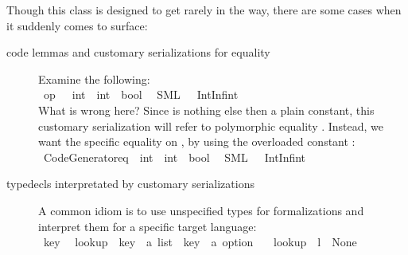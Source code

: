 \begin{isabellebody}
\begin{isamarkuptext}
  Though this class is designed to get rarely in the way, there
  are some cases when it suddenly comes to surface:%
\end{isamarkuptext}%
\isamarkuptrue%
%
\begin {description}
    \item[code lemmas and customary serializations for equality]
      Examine the following: \\
\isamarkupfalse%
\ {\isachardoublequoteopen}op\ {\isacharequal}\ {\isasymColon}\ int\ {\isasymRightarrow}\ int\ {\isasymRightarrow}\ bool{\isachardoublequoteclose}\isanewline
\ \ {\isacharparenleft}SML\ {\isachardoublequoteopen}{\isacharbang}{\isacharparenleft}{\isacharunderscore}\ {\isacharcolon}\ IntInf{\isachardot}int\ {\isacharequal}\ {\isacharunderscore}{\isacharparenright}{\isachardoublequoteclose}{\isacharparenright}%
\\ What is wrong here? Since  is nothing else then
  a plain constant, this customary serialization will refer
  to polymorphic equality .
  Instead, we want the specific equality on ,
  by using the overloaded constant : \\
\isamarkupfalse%
\ {\isachardoublequoteopen}Code{\isacharunderscore}Generator{\isachardot}eq\ {\isasymColon}\ int\ {\isasymRightarrow}\ int\ {\isasymRightarrow}\ bool{\isachardoublequoteclose}\isanewline
\ \ {\isacharparenleft}SML\ {\isachardoublequoteopen}{\isacharbang}{\isacharparenleft}{\isacharunderscore}\ {\isacharcolon}\ IntInf{\isachardot}int\ {\isacharequal}\ {\isacharunderscore}{\isacharparenright}{\isachardoublequoteclose}{\isacharparenright}%
\\ \item[typedecls interpretated by customary serializations] A
  common idiom is to use unspecified types for formalizations
  and interpret them for a specific target language: \\
\isamarkupfalse%
\ key\isanewline
\isanewline
{}\isamarkupfalse%
\isanewline
\ \ lookup\ {\isacharcolon}{\isacharcolon}\ {\isachardoublequoteopen}{\isacharparenleft}key\ {\isasymtimes}\ {\isacharprime}a{\isacharparenright}\ list\ {\isasymRightarrow}\ key\ {\isasymRightarrow}\ {\isacharprime}a\ option{\isachardoublequoteclose}\ \isanewline
\ \ {\isachardoublequoteopen}lookup\ {\isacharbrackleft}{\isacharbrackright}\ l\ {\isacharequal}\ None{\isachardoublequoteclose}\isanewline

\end{description}
\end{isabellebody}
